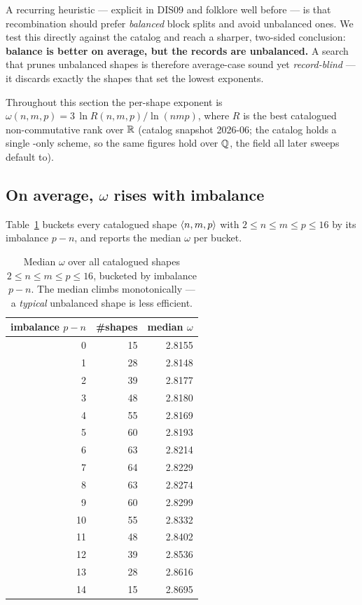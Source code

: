 
A recurring heuristic --- explicit in DIS09 and folklore well before --- is that
recombination should prefer \emph{balanced} block splits and avoid unbalanced
ones. We test this directly against the catalog and reach a sharper, two-sided
conclusion: \textbf{balance is better on average, but the records are
unbalanced.} A search that prunes unbalanced shapes is therefore average-case
sound yet \emph{record-blind} --- it discards exactly the shapes that set the
lowest exponents.

Throughout this section the per-shape exponent is
\(\omega(n,m,p) = 3\,\ln R(n,m,p) / \ln(nmp)\), where \(R\) is the best
catalogued non-commutative rank over \(\mathbb{R}\) (catalog snapshot
2026-06; the catalog holds a single \Reals-only scheme, so the same
figures hold over \(\mathbb{Q}\), the field all later sweeps default
to).

\subsection{On average, \texorpdfstring{\(\omega\)}{omega} rises with imbalance}
\label{ssec:omega-imbalance}

Table~\ref{tab:omega-imbalance} buckets every catalogued shape
\(\langle n, m, p \rangle\) with \(2 \le n \le m \le p \le 16\) by its imbalance
\(p-n\), and reports the median \(\omega\) per bucket.

\begin{table}[h]
\centering
\caption{Median \(\omega\) over all catalogued shapes
\(2 \le n \le m \le p \le 16\), bucketed by imbalance \(p-n\). The median
climbs monotonically --- a \emph{typical} unbalanced shape is less efficient.}
\label{tab:omega-imbalance}
\begin{tabular}{rrr}
\toprule
imbalance \(p-n\) & \#shapes & median \(\omega\) \\
\midrule
0  & 15 & 2.8155 \\
1  & 28 & 2.8148 \\
2  & 39 & 2.8177 \\
3  & 48 & 2.8180 \\
4  & 55 & 2.8169 \\
5  & 60 & 2.8193 \\
6  & 63 & 2.8214 \\
7  & 64 & 2.8229 \\
8  & 63 & 2.8274 \\
9  & 60 & 2.8299 \\
10 & 55 & 2.8332 \\
11 & 48 & 2.8402 \\
12 & 39 & 2.8536 \\
13 & 28 & 2.8616 \\
14 & 15 & 2.8695 \\
\bottomrule
\end{tabular}
\end{table}

